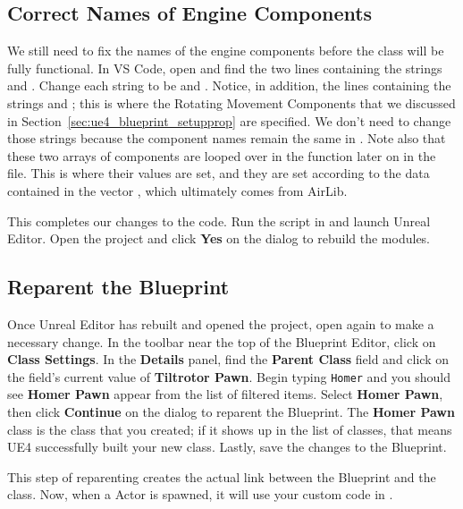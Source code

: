 \subsection{Correct Names of Engine Components}
We still need to fix the names of the engine components before the class will be fully functional. In VS Code, open  and find the two lines containing the strings  and . Change each string to be  and . Notice, in addition, the lines containing the strings  and ; this is where the Rotating Movement Components that we discussed in Section~\ref{sec:ue4_blueprint_setupprop} are specified. We don't need to change those strings because the component names remain the same in . Note also that these two arrays of components are looped over in the function  later on in the file. This is where their values are set, and they are set according to the data contained in the vector , which ultimately comes from AirLib.

This completes our changes to the code. Run the script  in  and launch Unreal Editor. Open the  project and click \textbf{Yes} on the dialog to rebuild the modules.

\subsection{Reparent the Blueprint}
Once Unreal Editor has rebuilt and opened the project, open  again to make a necessary change. In the toolbar near the top of the Blueprint Editor, click on \textbf{Class Settings}. In the \textbf{Details} panel, find the \textbf{Parent Class} field and click on the field's current value of \textbf{Tiltrotor Pawn}. Begin typing \texttt{Homer} and you should see \textbf{Homer Pawn} appear from the list of filtered items. Select \textbf{Homer Pawn}, then click \textbf{Continue} on the dialog to reparent the Blueprint. The \textbf{Homer Pawn} class is the  \CC class that you created; if it shows up in the list of classes, that means UE4 successfully built your new class. Lastly, save the changes to the Blueprint.

This step of reparenting creates the actual link between the  Blueprint and the  \CC class. Now, when a  Actor is spawned, it will use your custom code in .

